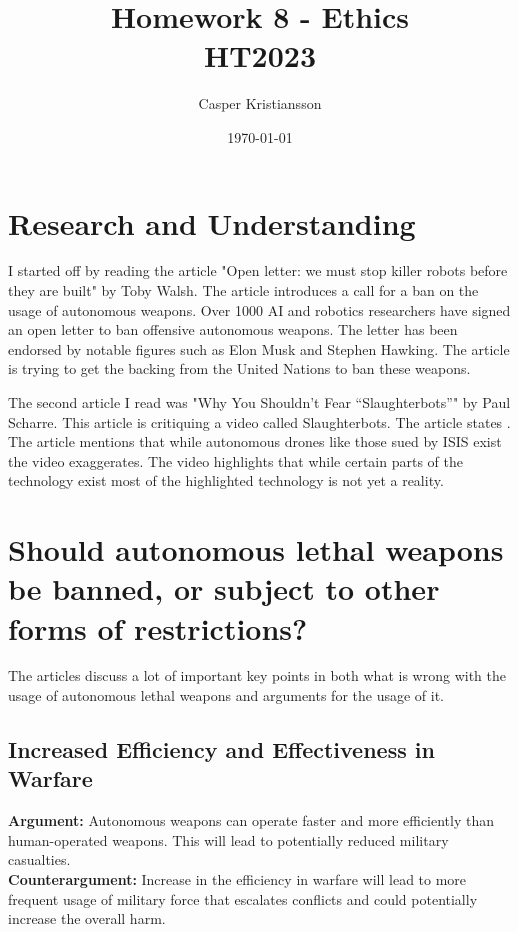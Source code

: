 \documentclass{article}
\title{Homework 8 - Ethics\\HT2023}
\author{Casper Kristiansson}
\date{\today}
\begin{document}
\maketitle

\section{Research and Understanding}
I started off by reading the article "Open letter: we must stop killer robots before they are built" \cite{Openlett7:online} by Toby Walsh. The article introduces a call for a ban on the usage of autonomous weapons. Over 1000 AI and robotics researchers have signed an open letter to ban offensive autonomous weapons. The letter has been endorsed by notable figures such as Elon Musk and Stephen Hawking. The article is trying to get the backing from the United Nations to ban these weapons.

The second article I read was "Why You Shouldn’t Fear “Slaughterbots”" \cite{WhyYouSh92:online} by Paul Scharre. This article is critiquing a video called Slaughterbots. The article states . The article mentions that while autonomous drones like those sued by ISIS exist the video exaggerates. The video highlights that while certain parts of the technology exist most of the highlighted technology is not yet a reality.

\section{Should autonomous lethal weapons be banned, or subject to other forms of restrictions?}
The articles discuss a lot of important key points in both what is wrong with the usage of autonomous lethal weapons and arguments for the usage of it.

\subsection{Increased Efficiency and Effectiveness in Warfare}
\textbf{Argument:} Autonomous weapons can operate faster and more efficiently than human-operated weapons. This will lead to potentially reduced military casualties. \\

\noindent \textbf{Counterargument:} Increase in the efficiency in warfare will lead to more frequent usage of military force that escalates conflicts and could potentially increase the overall harm.
\end{document}

